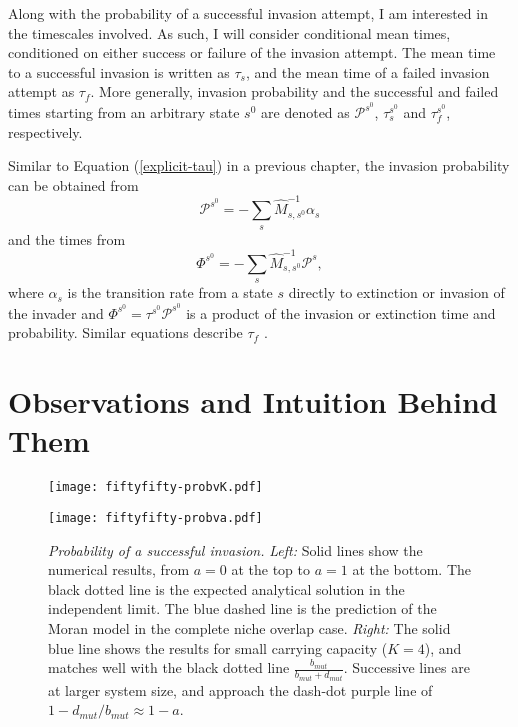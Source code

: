Along with the probability of a successful invasion attempt, I am interested in the timescales involved. 
As such, I will consider conditional mean times, conditioned on either success or failure of the invasion attempt. 
The mean time to a successful invasion is written as $\tau_s$, and the mean time of a failed invasion attempt as $\tau_f$. 
More generally, invasion probability and the successful and failed times starting from an arbitrary state $s^0$ are denoted as $\mathcal{P}^{s^0}$, $\tau_s^{s^0}$ and $\tau_f^{s^0}$, respectively. 

Similar to Equation (\ref{explicit-tau}) in a previous chapter, the invasion probability can be obtained from \cite{Nisbet1982,Iyer-Biswas2015}
\begin{equation}
\mathcal{P}^{s^0} = -\sum_s \hat{M}^{-1}_{s,s^0}\alpha_{s} %
\end{equation}
and the times from
\begin{equation}
\Phi^{s^0} = -\sum_s \hat{M}^{-1}_{s,s^0}\mathcal{P}^{s}, %
\end{equation}
where $\alpha_s$ is the transition rate from a state $s$ directly to extinction or invasion of the invader and $\Phi^{s^0}=\tau^{s^0}\mathcal{P}^{s^0}$ is a product of the invasion or extinction time and probability. 
Similar equations describe $\tau_f$ \cite{Nisbet1982,Iyer-Biswas2015}.


\section{Observations and Intuition Behind Them}
\begin{figure}[h]
	\centering
	\begin{minipage}{0.49\linewidth}
		\centering
		\texttt{[image: fiftyfifty-probvK.pdf]}
	\end{minipage}
	\begin{minipage}{0.49\linewidth}
		\centering
		\texttt{[image: fiftyfifty-probva.pdf]}
	\end{minipage}
	\caption{\emph{Probability of a successful invasion.}
		\emph{Left:} Solid lines show the numerical results, from $a=0$ at the top to $a=1$ at the bottom. The black dotted line is the expected analytical solution in the independent limit. The blue dashed line is the prediction of the Moran model in the complete niche overlap case.
		\emph{Right:} The solid blue line shows the results for small carrying capacity ($K=4$), and matches well with the black dotted line $\frac{b_{mut}}{b_{mut}+d_{mut}}$. Successive lines are at larger system size, and approach the dash-dot purple line of $1-d_{mut}/b_{mut}\approx 1-a$.
	} \label{Esucc}
\end{figure}

